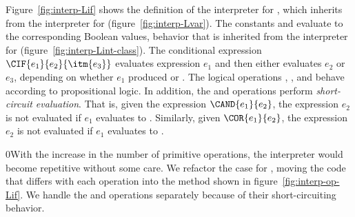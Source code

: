 \documentclass[7x10]{TimesAPriori_MIT}%
\def\racketEd{0}
\def\edition{1}
\newcommand{\racket}[1]{{\if\edition\racketEd{#1}\fi}}
\numberwithin{theorem}{chapter}
\numberwithin{definition}{chapter}
\numberwithin{equation}{chapter}
\begin{document}
Figure~\ref{fig:interp-Lif} shows the definition of the interpreter
for \LangIf{}, which inherits from the interpreter for \LangVar{}
(figure~\ref{fig:interp-Lvar}). The constants \TRUE{} and \FALSE{}
evaluate to the corresponding Boolean values, behavior that is
inherited from the interpreter for \LangInt{}
(figure~\ref{fig:interp-Lint-class}).
The conditional expression $\CIF{e_1}{e_2}{\itm{e_3}}$ evaluates
expression $e_1$ and then either evaluates $e_2$ or $e_3$, depending
on whether $e_1$ produced \TRUE{} or \FALSE{}. The logical operations
, , and  behave according to propositional
logic. In addition, the  and  operations perform
\emph{short-circuit evaluation}.
%
That is, given the expression $\CAND{e_1}{e_2}$, the expression $e_2$
is not evaluated if $e_1$ evaluates to \FALSE{}.
%
Similarly, given $\COR{e_1}{e_2}$, the expression $e_2$ is not
evaluated if $e_1$ evaluates to \TRUE{}.

\racket{With the increase in the number of primitive operations, the
  interpreter would become repetitive without some care.  We refactor
  the case for \code{Prim}, moving the code that differs with each
  operation into the \code{interp\_op} method shown in
  figure~\ref{fig:interp-op-Lif}. We handle the \code{and} and
  \code{or} operations separately because of their short-circuiting
  behavior.}
\end{document}
